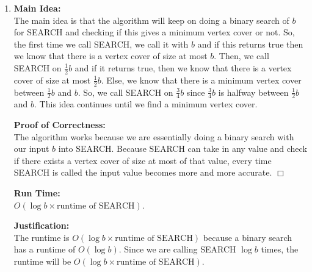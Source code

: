 \documentclass[11pt]{article}
\def\endproofmark{$\Box$}
\newenvironment{mainIdea}{\par{\bf Main Idea:}}{\smallskip}
\newenvironment{proofOfCorrectness}{\par{\bf Proof of Correctness:}}{\endproofmark\smallskip}
\newenvironment{runTime}{\par{\bf Run Time:}}{\smallskip}
\newenvironment{justification}{\par{\bf Justification:}}{\smallskip}
\begin{document}
\begin{enumerate}[label=(\alph*)]
\item
\begin{mainIdea}
\\
The main idea is that the algorithm will keep on doing a binary search of $b$ for SEARCH and checking if this gives a minimum vertex cover or not. So, the first time we call SEARCH, we call it with $b$ and if this returns true then we know that there is a vertex cover of size at most $b$. Then, we call SEARCH on $\frac{1} {2} b$ and if it returns true, then we know that there is a vertex cover of size at most $\frac{1} {2} b$. Else, we know that there is a minimum vertex cover between $\frac{1} {2} b$ and $b$. So, we call SEARCH on $\frac{3} {4} b$ since $\frac{3} {4} b$ is halfway between $\frac{1} {2} b$ and $b$. This idea continues until we find a minimum vertex cover.
\end{mainIdea}
\\
\begin{proofOfCorrectness}
\\
The algorithm works because we are essentially doing a binary search with our input $b$ into SEARCH. Because SEARCH can take in any value and check if there exists a vertex cover of size at most of that value, every time SEARCH is called the input value becomes more and more accurate.
\end{proofOfCorrectness}
\\
\begin{runTime}
\\
$O(\log{b} \times \text{runtime of SEARCH})$.
\end{runTime}
\\
\begin{justification}
\\
The runtime is $O(\log{b} \times \text{runtime of SEARCH})$ because a binary search has a runtime of $O(\log{b})$. Since we are calling SEARCH $\log{b}$ times, the runtime will be $O(\log{b} \times \text{runtime of SEARCH})$.
\end{justification}
\end{enumerate}



\newpage
\end{document}
